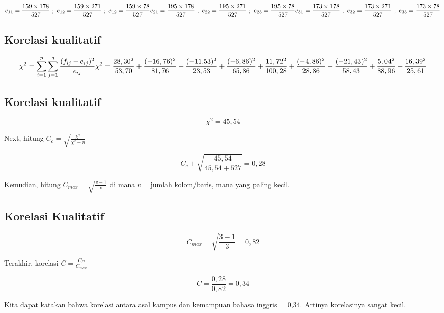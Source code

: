 \documentclass[
  letterpaper,
  DIV=11,
  numbers=noendperiod]{scrartcl}
\begin{document}
\[
e_{11}=\frac{159 \times 178}{527} \ ; \ e_{12}=\frac{159 \times 271}{527} \ ; \ e_{12}=\frac{159 \times 78}{527} \\ e_{21}=\frac{195 \times 178}{527} \ ; \ e_{22}=\frac{195 \times 271}{527} \ ; \ e_{23}=\frac{195 \times 78}{527} \\ e_{31}=\frac{173 \times 178}{527} \ ; \ e_{32}=\frac{173 \times 271}{527} \ ; \ e_{33}=\frac{173 \times 78}{527}
\]

\hypertarget{korelasi-kualitatif-3}{%
\subsection{Korelasi kualitatif}\label{korelasi-kualitatif-3}}

\[
\chi^2=\sum_{i=1}^{p} \sum_{j=1}^{q} \frac{(f_{ij}-e_{ij})^2}{e_{ij}} \\ \chi^2=\frac{28,30^2}{53,70}+\frac{(-16,76)^2}{81,76}+\frac{(-11.53)^2}{23,53} \\ +\frac{(-6,86)^2}{65,86}+\frac{11,72^2}{100,28}+\frac{(-4,86)^2}{28,86} \\ +\frac{(-21,43)^2}{58,43}+\frac{5,04^2}{88,96}+\frac{16,39^2}{25,61}
\]

\hypertarget{korelasi-kualitatif-4}{%
\subsection{Korelasi kualitatif}\label{korelasi-kualitatif-4}}

\[
\chi^2=45,54
\]

Next, hitung \(C_c=\sqrt{\frac{\chi^2}{\chi^2+n}}\)

\[
C_c+\sqrt{\frac{45,54}{45,54+527}}=0,28
\]

Kemudian, hitung \(C_{max}=\sqrt{\frac{v-1}{v}}\) di mana \(v=\)jumlah
kolom/baris, mana yang paling kecil.

\hypertarget{korelasi-kualitatif-5}{%
\subsection{Korelasi Kualitatif}\label{korelasi-kualitatif-5}}

\[
C_{max}=\sqrt{\frac{3-1}{3}}=0,82
\]

Terakhir, korelasi \(C=\frac{C_C}{C_{max}}\)

\[
C=\frac{0,28}{0,82}=0,34
\]

Kita dapat katakan bahwa korelasi antara asal kampus dan kemampuan
bahasa inggris = 0,34. Artinya korelasinya sangat kecil.
\end{document}

